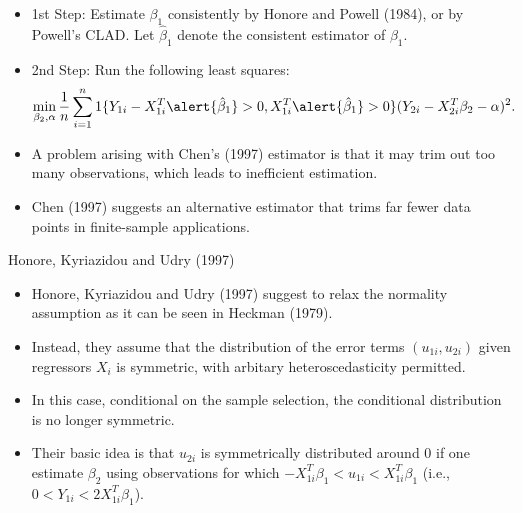 \documentclass[xcolor=svgnames,dvipdfmx,cjk]{beamer}
\theoremstyle{example}
\begin{document}
\begin{frame}
      \begin{itemize}
            \item \alert{1st Step}: Estimate $\beta_1$ consistently 
                  by Honore and Powell (1984), or by Powell's CLAD.
                  Let $\hat{\beta}_1$ denote the consistent estimator of $\beta_1$.
            \item \alert{2nd Step}: Run the following least squares:
                  \begin{align*}
                        \min_{\beta_2, \alpha}
                                \frac{1}{n} \sum_{i=1}^n 
                                1\{ %
                                    Y_{1i} - X_{1i}^T \alert{\hat{\beta}_1} > 0,
                                    X_{1i}^T \alert{\hat{\beta}_1} > 0                                
                                  \} 
                                (Y_{2i} - X_{2i}^T \beta_2 - \alpha)^2.
                  \end{align*}
            \item A problem arising with Chen's (1997) estimator is that 
                  it may trim out too many observations, which leads to inefficient estimation.
            \item Chen (1997) suggests an alternative estimator that trims far fewer data points in finite-sample applications.
      \end{itemize}
\end{frame}


\begin{frame}{Honore, Kyriazidou and Udry (1997)}
      \begin{itemize}
            \item Honore, Kyriazidou and Udry (1997) suggest to relax 
                  the normality assumption as it can be seen in Heckman (1979).
            \item Instead, they assume that 
                  the distribution of the error terms $(u_{1i}, u_{2i})$ 
                  given regressors $X_i$ is symmetric, 
                  with arbitary heteroscedasticity permitted.
            \item In this case, conditional on the sample selection, 
                  the conditional distribution is no longer symmetric.
            \item Their basic idea is that 
                  \alert{
                  $u_{2i}$ is symmetrically distributed around $0$ 
                  }
                  if one estimate $\beta_2$  using 
                  \alert{
                  observations for which $-X_{1i}^T \beta_1 < u_{1i} < X_{1i}^T \beta_1$} 
                  (i.e., $0 < Y_{1i} < 2 X_{1i}^T \beta_1$).
      \end{itemize}
\end{frame}
\end{document}
